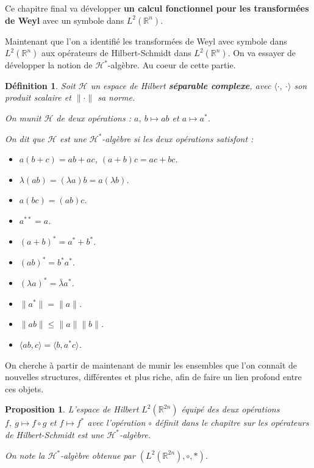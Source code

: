 \documentclass[a4paper, 12pt]{report}
\newcommand{\R}{\mathbb{R}} %
\renewcommand{\.}{\cdot} %
\theoremstyle{break}
\newtheorem{definition}{Définition}
\newtheorem{proposition}{Proposition}
\theoremstyle{remark}
\theoremstyle{proofstyle}
\begin{document}
Ce chapitre final va développer \textbf{un calcul fonctionnel pour les transformées de Weyl} avec un symbole dans $L^2(\R^n)$. \vspace{5pt}

Maintenant que l'on a identifié les transformées de Weyl avec symbole dans $L^2(\R^n)$ aux opérateurs de Hilbert-Schmidt dans $L^2(\R^n)$. On va essayer de développer la notion de $\mathcal{H}^*$-algèbre. Au coeur de cette partie.

\begin{definition}
    Soit $\mathcal{H}$ un espace de Hilbert \textbf{séparable complexe}, avec $\langle \.,~ \. \rangle$ son produit scalaire et $\| \. \|$ sa norme. \vspace{5pt}

    On munit $\mathcal{H}$ de deux opérations :
    $a,~ b \mapsto ab$ et $a \mapsto a^*$.\vspace{5pt}

    On dit que $\mathcal{H}$ est une \textbf{$\mathcal{H^*}$}-algèbre si les deux opérations satisfont :


    \begin{itemize}\setlength{\itemsep}{1pt}
        \item $ a(b+c) = ab+ac$, $(a+b)c = ac+bc$.
        \item $ \lambda (ab) = (\lambda a) b = a (\lambda b)$.
        \item $ a(bc) = (ab)c$.
        \item $a^{**}=a$.
        \item $(a+b)^* = a^*+b^*$.
        \item $(ab)^* = b^* a^*$.
        \item $ (\lambda a)^* = \bar{\lambda} a^*$.
        \item $\| a^* \| = \| a \|$.
        \item $\|ab\| \leq \|a\| \|b\|$.
        \item $\langle ab, c \rangle = \langle b, a^*c \rangle$.
    \end{itemize}

\end{definition}

On cherche à partir de maintenant de munir les ensembles que l'on connaît de nouvelles structures, différentes et plus riche, afin de faire un lien profond entre ces objets.

\begin{proposition}
    L'espace de Hilbert $L^2(\R^{2n})$ équipé des deux opérations $f,~ g \mapsto f \circ g$ et $f \mapsto f^*$ avec l'opération $\circ$ définit dans le chapitre sur les opérateurs de Hilbert-Schmidt est une $\mathcal{H}^*$-algèbre. \vspace{5pt}

    On note la $\mathcal{H}^*$-algèbre obtenue par $(L^2(\R^{2n}), \circ, *)$.
\end{proposition}
\end{document}
